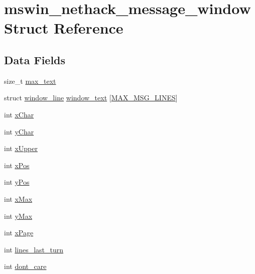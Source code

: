 \hypertarget{structmswin__nethack__message__window}{\section{mswin\+\_\+nethack\+\_\+message\+\_\+window Struct Reference}
\label{structmswin__nethack__message__window}
}
\subsection*{Data Fields}
\begin{DoxyCompactItemize}
\item 
size\+\_\+t \hyperlink{structmswin__nethack__message__window_aa5bff51a92ce67744b3df06ad74fbc92}{max\+\_\+text}
\item 
struct \hyperlink{structwindow__line}{window\+\_\+line} \hyperlink{structmswin__nethack__message__window_a0e392ae401c1cc51fd7aa0cc8ecbae95}{window\+\_\+text} \mbox{[}\hyperlink{win_2win32_2mhmsgwnd_8c_af62d3eba40911b9d82f6e377b48a50e2}{M\+A\+X\+\_\+\+M\+S\+G\+\_\+\+L\+I\+N\+E\+S}\mbox{]}
\item 
int \hyperlink{structmswin__nethack__message__window_a3a2ddfa2880d9e42fe99c727c9f52a6f}{x\+Char}
\item 
int \hyperlink{structmswin__nethack__message__window_abcddabdea03ae3f33b1459fb81075dae}{y\+Char}
\item 
int \hyperlink{structmswin__nethack__message__window_a78d9744ac68cb597f4917b871ba9f134}{x\+Upper}
\item 
int \hyperlink{structmswin__nethack__message__window_a2d63ab3f820de7f35b50f99c982dbf55}{x\+Pos}
\item 
int \hyperlink{structmswin__nethack__message__window_aa0b66211653f6020214bb6e9ba806e39}{y\+Pos}
\item 
int \hyperlink{structmswin__nethack__message__window_a4a4612686946a3904c34c050753583cb}{x\+Max}
\item 
int \hyperlink{structmswin__nethack__message__window_a89b10107b69dc753430b418076cb300f}{y\+Max}
\item 
int \hyperlink{structmswin__nethack__message__window_ad9bd73638158de8be8fae776b862e639}{x\+Page}
\item 
int \hyperlink{structmswin__nethack__message__window_a15ac3ae0e42d4bf54132068138905b66}{lines\+\_\+last\+\_\+turn}
\item 
int \hyperlink{structmswin__nethack__message__window_a2a4528b8e453d2d46e33c1d6262c64c5}{dont\+\_\+care}

\end{DoxyCompactItemize}
